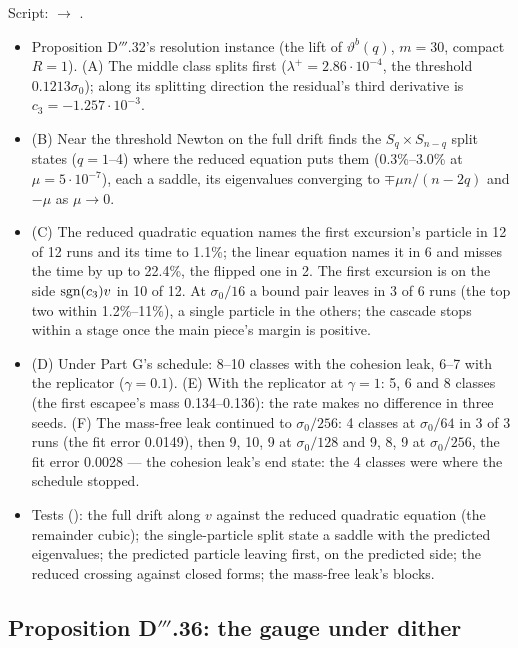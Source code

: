 Script:  $\to$ .
\begin{itemize}
  \item Proposition D$'''$.32's resolution instance (the lift of $\vartheta^b(q)$, $m=30$, compact $R=1$). (A) The
    middle class splits first ($\lambda^+=2.86\cdot10^{-4}$, the threshold $0.1213\sigma_0$); along its splitting
    direction the residual's third derivative is $c_3=-1.257\cdot10^{-3}$.
  \item (B) Near the threshold Newton on the full drift finds the $S_q\times S_{n-q}$ split states ($q=1$--4) where
    the reduced equation puts them (0.3\%--3.0\% at $\mu=5\cdot10^{-7}$), each a saddle, its eigenvalues converging
    to $\mp\mu n/(n-2q)$ and $-\mu$ as $\mu\to0$.
  \item (C) The reduced quadratic equation names the first excursion's particle in 12 of 12 runs and its time to
    1.1\%; the linear equation names it in 6 and misses the time by up to 22.4\%, the flipped one in 2. The first
    excursion is on the side $\operatorname{sgn}(c_3)v$ in 10 of 12. At $\sigma_0/16$ a bound pair leaves in 3 of 6 runs (the top
    two within 1.2\%--11\%), a single particle in the others; the cascade stops within a stage once the main piece's
    margin is positive.
  \item (D) Under Part G's schedule: 8--10 classes with the cohesion leak, 6--7 with the replicator ($\gamma=0.1$).
    (E) With the replicator at $\gamma=1$: 5, 6 and 8 classes (the first escapee's mass 0.134--0.136): the rate makes
    no difference in three seeds. (F) The mass-free leak continued to $\sigma_0/256$: 4 classes at $\sigma_0/64$ in 3
    of 3 runs (the fit error 0.0149), then 9, 10, 9 at $\sigma_0/128$ and 9, 8, 9 at $\sigma_0/256$, the fit error
    0.0028 --- the cohesion leak's end state: the 4 classes were where the schedule stopped.
  \item Tests (): the full drift along $v$ against the reduced quadratic
    equation (the remainder cubic); the single-particle split state a saddle with the predicted eigenvalues; the
    predicted particle leaving first, on the predicted side; the reduced crossing against closed forms; the
    mass-free leak's blocks.
\end{itemize}

\subsection{Proposition D\texorpdfstring{$'''$}{'''}.36: the gauge under dither}

